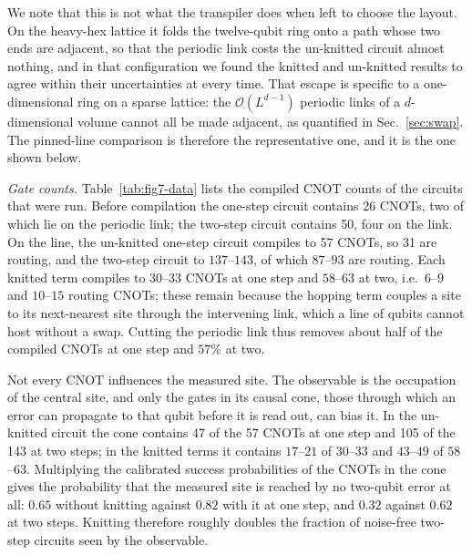 \documentclass[twocolumn,superscriptaddress,showpacs,nofootinbib,notitlepage,preprintnumbers,secnumarabic,amssymb, floatfix, nobibnotes, aps, prd]{revtex4-2}
\begin{document}
We note that this is not what the transpiler does when left to choose the
layout.  On the heavy-hex lattice it folds the twelve-qubit ring onto a path
whose two ends are adjacent, so that the periodic link costs the un-knitted
circuit almost nothing, and in that configuration we found the knitted and
un-knitted results to agree within their uncertainties at every time.  That
escape is specific to a one-dimensional ring on a sparse lattice: the
$\mathcal{O}(L^{d-1})$ periodic links of a $d$-dimensional volume cannot all
be made adjacent, as quantified in Sec.~\ref{sec:swap}.  The pinned-line
comparison is therefore the representative one, and it is the one shown
below.

\noindent\textit{Gate counts.}\quad
Table~\ref{tab:fig7-data} lists the compiled CNOT counts of the circuits
that were run.  Before compilation the one-step circuit contains 26 CNOTs,
two of which lie on the periodic link; the two-step circuit contains 50, four
on the link.  On the line, the un-knitted one-step circuit compiles to 57
CNOTs, so 31 are routing, and the two-step circuit to $137$--$143$, of which
$87$--$93$ are routing.  Each knitted term compiles to $30$--$33$ CNOTs at one
step and $58$--$63$ at two, i.e.\ $6$--$9$ and $10$--$15$ routing CNOTs; these
remain because the hopping term couples a site to its next-nearest site
through the intervening link, which a line of qubits cannot host without a
swap.  Cutting the periodic link thus removes about half of the compiled
CNOTs at one step and $57\%$ at two.

Not every CNOT influences the measured site.  The observable is the
occupation of the central site, and only the gates in its causal cone, those
through which an error can propagate to that qubit before it is read out, can
bias it.  In the un-knitted circuit the cone contains 47 of the 57 CNOTs at
one step and 105 of the 143 at two steps; in the knitted terms it contains
$17$--$21$ of $30$--$33$ and $43$--$49$ of $58$--$63$.  Multiplying the
calibrated success probabilities of the CNOTs in the cone gives the
probability that the measured site is reached by no two-qubit error at all:
$0.65$ without knitting against $0.82$ with it at one step, and $0.32$ against
$0.62$ at two steps.  Knitting therefore roughly doubles the fraction of
noise-free two-step circuits seen by the observable.
\end{document}
